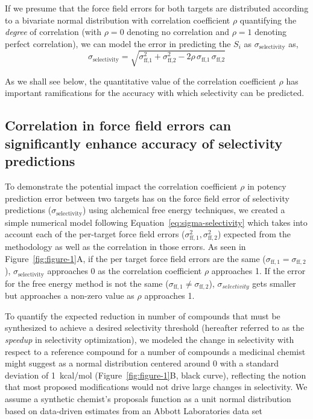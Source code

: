 \documentclass[phd,tocprelim]{cornell}
\begin{document}
If we presume that the force field errors for both targets are distributed according to a bivariate normal distribution with correlation coefficient $\rho$ quantifying the \emph{degree} of correlation (with $\rho = 0$ denoting no correlation and $\rho = 1$ denoting perfect correlation), we can model the error in predicting the $S_i$ as $\sigma_\text{selectivity}$ as,
\begin{equation}\label{eq:sigma-selectivity}
\sigma_\text{selectivity} = \sqrt{\sigma_\text{ff,1}^2 + \sigma_\text{ff,2}^2 - 2 \rho \, \sigma_\text{ff,1} \, \sigma_\text{ff,2}}
\end{equation}

As we shall see below, the quantitative value of the correlation coefficient $\rho$ has important ramifications for the accuracy with which selectivity can be predicted.

\subsection{Correlation in force field errors can significantly enhance accuracy of selectivity predictions}

To demonstrate the potential impact the correlation coefficient $\rho$ in potency prediction error between two targets has on the force field error of selectivity predictions ($\sigma_\text{selectivity}$) using alchemical free energy techniques, we created a simple numerical model following Equation~\ref{eq:sigma-selectivity} which takes into account each of the per-target force field errors ($\sigma^2_{\text{ff},1}, \sigma^2_{\text{ff},2}$) expected from the methodology as well as the correlation in those errors. 
As seen in Figure~\ref{fig:figure-1}A, if the per target force field errors are the same ($\sigma_{\text{ff},1} = \sigma_{\text{ff},2}$), $\sigma_\text{selectivity}$ approaches 0 as the correlation coefficient $\rho$ approaches 1. 
If the error for the free energy method is not the same ($\sigma_{\text{ff},1} \neq \sigma_{\text{ff},2}$), $\sigma_{selectivity}$ gets smaller but approaches a non-zero value as $\rho$ approaches 1. 

To quantify the expected reduction in number of compounds that must be synthesized to achieve a desired selectivity threshold (hereafter referred to as the \emph{speedup} in selectivity optimization), we modeled the change in selectivity with respect to a reference compound for a number of compounds a medicinal chemist might suggest as a normal distribution centered around 0 with a standard deviation of 1~kcal/mol (Figure~\ref{fig:figure-1}B, black curve), reflecting the notion that most proposed modifications would not drive large changes in selectivity. 
We assume a synthetic chemist's proposals function as a unit normal distribution based on data-driven estimates from an Abbott Laboratories data set~\citep{shirts-mobley-brown:2009:sbdd}  
\end{document}
